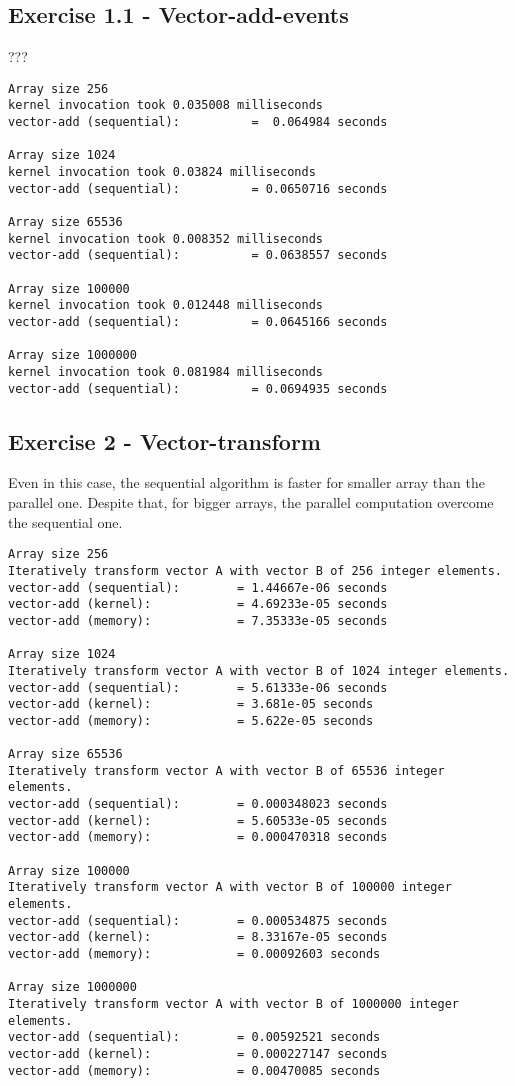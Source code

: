\documentclass[a4paper]{article}
\begin{document}
\subsection{Exercise 1.1 - Vector-add-events}

???

\begin{verbatim}
Array size 256
kernel invocation took 0.035008 milliseconds
vector-add (sequential): 		  =  0.064984 seconds

Array size 1024
kernel invocation took 0.03824 milliseconds
vector-add (sequential): 		  = 0.0650716 seconds

Array size 65536
kernel invocation took 0.008352 milliseconds
vector-add (sequential): 		  = 0.0638557 seconds

Array size 100000
kernel invocation took 0.012448 milliseconds
vector-add (sequential): 		  = 0.0645166 seconds

Array size 1000000
kernel invocation took 0.081984 milliseconds
vector-add (sequential): 		  = 0.0694935 seconds
\end{verbatim}

\subsection{Exercise 2 - Vector-transform}

Even in this case, the sequential algorithm is faster for smaller array than the parallel one. Despite that, for bigger arrays, the parallel computation overcome the sequential one.

\begin{verbatim}
Array size 256
Iteratively transform vector A with vector B of 256 integer elements.
vector-add (sequential):        = 1.44667e-06 seconds
vector-add (kernel):            = 4.69233e-05 seconds
vector-add (memory):            = 7.35333e-05 seconds

Array size 1024
Iteratively transform vector A with vector B of 1024 integer elements.
vector-add (sequential):        = 5.61333e-06 seconds
vector-add (kernel):            = 3.681e-05 seconds
vector-add (memory):            = 5.622e-05 seconds

Array size 65536
Iteratively transform vector A with vector B of 65536 integer elements.
vector-add (sequential):        = 0.000348023 seconds
vector-add (kernel):            = 5.60533e-05 seconds
vector-add (memory):            = 0.000470318 seconds

Array size 100000
Iteratively transform vector A with vector B of 100000 integer elements.
vector-add (sequential):        = 0.000534875 seconds
vector-add (kernel):            = 8.33167e-05 seconds
vector-add (memory):            = 0.00092603 seconds

Array size 1000000
Iteratively transform vector A with vector B of 1000000 integer elements.
vector-add (sequential):        = 0.00592521 seconds
vector-add (kernel):            = 0.000227147 seconds
vector-add (memory):            = 0.00470085 seconds
\end{verbatim}
\end{document}
